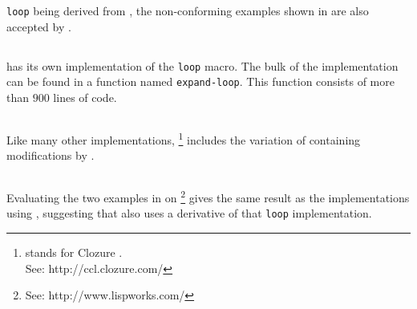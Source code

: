 \sbcl{} \texttt{loop} being derived from \mitloop{}, the
non-conforming examples shown in  are also accepted
by \sbcl{}.

\subsection{\clisp{}}

\clisp{} has its own implementation of the \texttt{loop} macro.  The
bulk of the implementation can be found in a function named
\texttt{expand-loop}.  This function consists of more than $900$ lines
of code.

\subsection{\ccl{}}

Like many other implementations, \ccl{}%
\footnote{\ccl{} stands for Clozure \commonlisp.\\ See:
  http://ccl.clozure.com/} includes the variation of \mitloop{}
containing modifications by \symbolics{}.

\subsection{\lispworks}

Evaluating the two examples in  on \lispworks{}%
\footnote{See: http://www.lispworks.com/}
gives the same result as the implementations using \mitloop{},
suggesting that \lispworks{} also uses a derivative of that
\texttt{loop} implementation.
